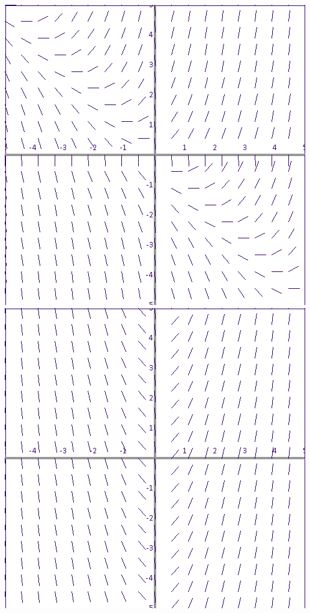 \documentclass{article}
\begin{document}
\includegraphics[width=\textwidth]{3}\\
\includegraphics[width=\textwidth]{4}\\
\end{document}
